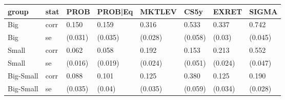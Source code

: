 
\begin{tabular}{l|l|l|l|l|l|l|l}
\hline
group & stat & PROB & PROB|Eq & MKTLEV & CS5y & EXRET & SIGMA\\
\hline
Big & corr & 0.150 & 0.159 & 0.316 & 0.533 & 0.337 & 0.742\\
Big & se & (0.031) & (0.035) & (0.028) & (0.058) & (0.03) & (0.045)\\
Small & corr & 0.062 & 0.058 & 0.192 & 0.153 & 0.213 & 0.552\\
Small & se & (0.016) & (0.019) & (0.024) & (0.051) & (0.024) & (0.047)\\
Big-Small & corr & 0.088 & 0.101 & 0.125 & 0.380 & 0.125 & 0.190\\
Big-Small & se & (0.035) & (0.04) & (0.035) & (0.059) & (0.034) & (0.028)\\
\hline
\end{tabular}
